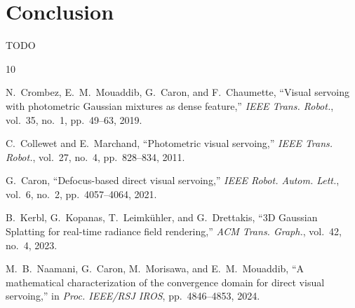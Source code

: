 \documentclass[journal]{IEEEtran}
\begin{document}
\section{Conclusion}
\label{sec:conclusion}
TODO


\begin{thebibliography}{10}

N.~Crombez, E.~M.~Mouaddib, G.~Caron, and F.~Chaumette,
``Visual servoing with photometric Gaussian mixtures as dense feature,''
\emph{IEEE Trans. Robot.}, vol.~35, no.~1, pp.~49--63, 2019.

C.~Collewet and E.~Marchand,
``Photometric visual servoing,''
\emph{IEEE Trans. Robot.}, vol.~27, no.~4, pp.~828--834, 2011.

G.~Caron,
``Defocus-based direct visual servoing,''
\emph{IEEE Robot. Autom. Lett.}, vol.~6, no.~2, pp.~4057--4064, 2021.

B.~Kerbl, G.~Kopanas, T.~Leimk{\"u}hler, and G.~Drettakis,
``3D Gaussian Splatting for real-time radiance field rendering,''
\emph{ACM Trans. Graph.}, vol.~42, no.~4, 2023.

M.~B.~Naamani, G.~Caron, M.~Morisawa, and E.~M.~Mouaddib,
``A mathematical characterization of the convergence domain for direct visual servoing,''
in \emph{Proc. IEEE/RSJ IROS}, pp.~4846--4853, 2024.

\end{thebibliography}
\end{document}
